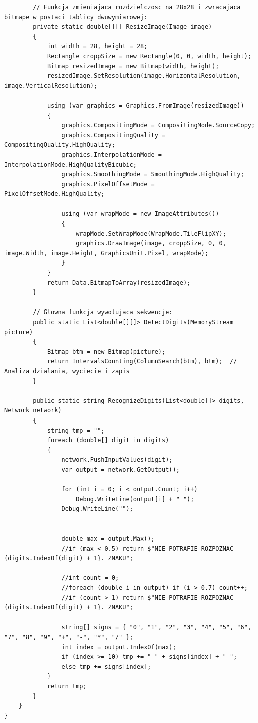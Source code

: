 \documentclass[12pt,a4paper]{article}
\begin{document}
\begin{lstlisting}
        // Funkcja zmieniajaca rozdzielczosc na 28x28 i zwracajaca bitmape w postaci tablicy dwuwymiarowej:
        private static double[][] ResizeImage(Image image)
        {
            int width = 28, height = 28;
            Rectangle croppSize = new Rectangle(0, 0, width, height);
            Bitmap resizedImage = new Bitmap(width, height);
            resizedImage.SetResolution(image.HorizontalResolution, image.VerticalResolution);

            using (var graphics = Graphics.FromImage(resizedImage))
            {
                graphics.CompositingMode = CompositingMode.SourceCopy;
                graphics.CompositingQuality = CompositingQuality.HighQuality;
                graphics.InterpolationMode = InterpolationMode.HighQualityBicubic;
                graphics.SmoothingMode = SmoothingMode.HighQuality;
                graphics.PixelOffsetMode = PixelOffsetMode.HighQuality;

                using (var wrapMode = new ImageAttributes())
                {
                    wrapMode.SetWrapMode(WrapMode.TileFlipXY);
                    graphics.DrawImage(image, croppSize, 0, 0, image.Width, image.Height, GraphicsUnit.Pixel, wrapMode);
                }
            }
            return Data.BitmapToArray(resizedImage);
        }

        // Glowna funkcja wywolujaca sekwencje:
        public static List<double[][]> DetectDigits(MemoryStream picture)
        {
            Bitmap btm = new Bitmap(picture);
            return IntervalsCounting(ColumnSearch(btm), btm);  // Analiza dzialania, wyciecie i zapis
        }

        public static string RecognizeDigits(List<double[]> digits, Network network)
        {
            string tmp = "";
            foreach (double[] digit in digits)
            {
                network.PushInputValues(digit);
                var output = network.GetOutput();

                for (int i = 0; i < output.Count; i++)
                    Debug.WriteLine(output[i] + " ");
                Debug.WriteLine("");

                
                double max = output.Max();
                //if (max < 0.5) return $"NIE POTRAFIE ROZPOZNAC {digits.IndexOf(digit) + 1}. ZNAKU";

                //int count = 0; 
                //foreach (double i in output) if (i > 0.7) count++;
                //if (count > 1) return $"NIE POTRAFIE ROZPOZNAC {digits.IndexOf(digit) + 1}. ZNAKU";

                string[] signs = { "0", "1", "2", "3", "4", "5", "6", "7", "8", "9", "+", "-", "*", "/" };
                int index = output.IndexOf(max);
                if (index >= 10) tmp += " " + signs[index] + " ";
                else tmp += signs[index];
            }
            return tmp;
        }
    }
}
	\end{lstlisting}
\end{document}
